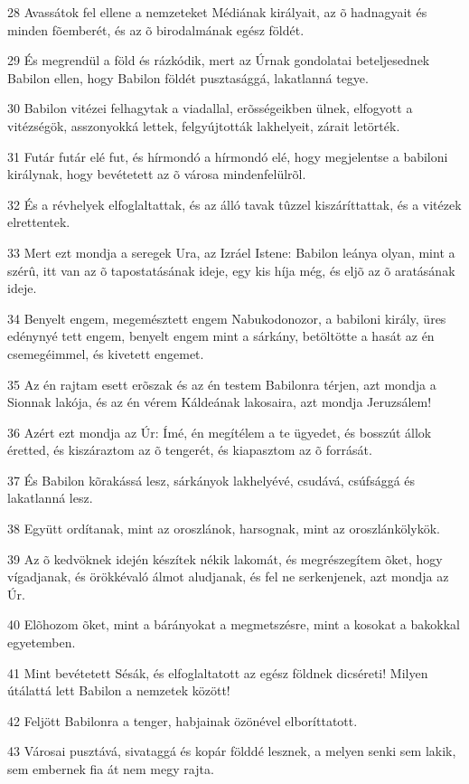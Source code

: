 \par 28 Avassátok fel ellene a nemzeteket Médiának királyait, az õ hadnagyait és minden fõemberét, és az õ birodalmának egész földét.
\par 29 És megrendül a föld és rázkódik, mert az Úrnak gondolatai beteljesednek Babilon ellen, hogy Babilon földét pusztasággá, lakatlanná tegye.
\par 30 Babilon vitézei felhagytak a viadallal, erõsségeikben ülnek, elfogyott a vitézségök, asszonyokká lettek, felgyújtották lakhelyeit, zárait letörték.
\par 31 Futár futár elé fut, és hírmondó a hírmondó elé, hogy megjelentse a babiloni királynak, hogy bevétetett az õ városa mindenfelülrõl.
\par 32 És a révhelyek elfoglaltattak, és az álló tavak tûzzel kiszáríttattak, és a vitézek elrettentek.
\par 33 Mert ezt mondja a seregek Ura, az Izráel Istene: Babilon leánya olyan, mint a szérû, itt van az õ tapostatásának ideje, egy kis híja még, és eljõ az õ aratásának ideje.
\par 34 Benyelt engem, megemésztett engem Nabukodonozor, a babiloni király, üres edénynyé tett engem, benyelt engem mint a sárkány, betöltötte a hasát az én csemegéimmel, és kivetett engemet.
\par 35 Az én rajtam esett erõszak és az én testem Babilonra térjen, azt mondja a Sionnak lakója, és az én vérem Káldeának lakosaira, azt mondja Jeruzsálem!
\par 36 Azért ezt mondja az Úr: Ímé, én megítélem a te ügyedet, és bosszút állok éretted, és kiszáraztom az õ tengerét, és kiapasztom az õ forrását.
\par 37 És Babilon kõrakássá lesz, sárkányok lakhelyévé, csudává, csúfsággá és lakatlanná lesz.
\par 38 Együtt ordítanak, mint az oroszlánok, harsognak, mint az oroszlánkölykök.
\par 39 Az õ kedvöknek idején készítek nékik lakomát, és megrészegítem õket, hogy vígadjanak, és örökkévaló álmot aludjanak, és fel ne serkenjenek, azt mondja az Úr.
\par 40 Elõhozom õket, mint a bárányokat a megmetszésre, mint a kosokat a bakokkal egyetemben.
\par 41 Mint bevétetett Sésák, és elfoglaltatott az egész földnek dicséreti! Milyen útálattá lett Babilon a nemzetek között!
\par 42 Feljött Babilonra a tenger, habjainak özönével elboríttatott.
\par 43 Városai pusztává, sivataggá és kopár földdé lesznek, a melyen senki sem lakik, sem embernek fia át nem megy rajta.
